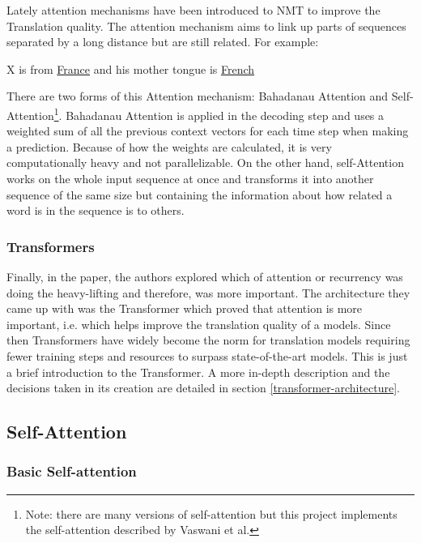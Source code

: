 \documentclass[12pt,a4paper,twoside,openright]{report}
\newcommand{\changedFont}[1]{{\fontfamily{qcr}\selectfont #1}}
\begin{document}
 Lately attention mechanisms\cite{attention-first} have been introduced to NMT to improve the Translation quality. The attention mechanism aims to link up parts of sequences separated by a long distance but are still related. For example:
\begin{center}
    \changedFont{X is from \underline{France} and his mother tongue is \underline{French}}
\end{center}
There are two forms of this Attention mechanism: Bahadanau Attention\cite{attention-first} and Self-Attention\footnote{Note: there are many versions of self-attention but this project implements the self-attention described by Vaswani et al.}\cite{transformers}. Bahadanau Attention is applied in the decoding step and uses a weighted sum of all the previous context vectors for each time step when making a prediction. Because of how the weights are calculated, it is very computationally heavy and not parallelizable. On the other hand, self-Attention works on the whole input sequence at once and transforms it into another sequence of the same size but containing the information about how related a word is in the sequence is to others.


\subsubsection{Transformers}
Finally, in the paper\cite{transformers}, the authors explored which of attention or recurrency was doing the heavy-lifting and therefore, was more important. The architecture they came up with was the Transformer which proved that attention is more important, i.e. which helps improve the translation quality of a models. Since then Transformers have widely become the norm for translation models requiring fewer training steps and resources to surpass state-of-the-art models.
This is just a brief introduction to the Transformer. A more in-depth description and the decisions taken in its creation are detailed in section \ref{transformer-architecture}.


\subsection{Self-Attention}
\label{self-attention}

\subsubsection{Basic Self-attention}
\end{document}
